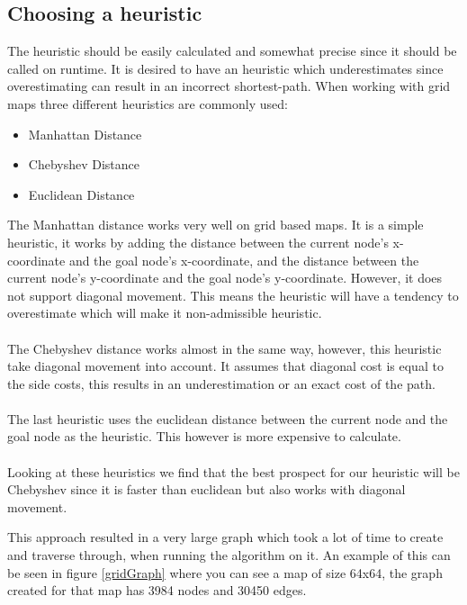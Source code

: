 \subsection*{Choosing a heuristic}
The heuristic should be easily calculated and somewhat precise since it should be called on runtime.
It is desired to have an heuristic which underestimates since overestimating can result in an incorrect shortest-path.
When working with grid maps three different heuristics are commonly used: %
\begin{itemize}
\item Manhattan Distance
\item Chebyshev Distance
\item Euclidean Distance
\end{itemize}
The Manhattan distance works very well on grid based maps. 
It is a simple heuristic, it works by adding the distance between the current node's x-coordinate and the goal node's x-coordinate, and the distance between the current node's y-coordinate and the goal node's y-coordinate.
However, it does not support diagonal movement. 
This means the heuristic will have a tendency to overestimate which will make it non-admissible heuristic.\\\\
The Chebyshev distance works almost in the same way, however, this heuristic take diagonal movement into account. 
It assumes that diagonal cost is equal to the side costs, this results in an underestimation or an exact cost of the path.\\\\
The last heuristic uses the euclidean distance between the current node and the goal node as the heuristic.
This however is more expensive to calculate.\\\\
Looking at these heuristics we find that the best prospect for our heuristic will be Chebyshev since it is faster than euclidean but also works with diagonal movement.

This approach resulted in a very large graph which took a lot of time to create and traverse through, when running the algorithm on it.
An example of this can be seen in figure \ref{gridGraph} where you can see a map of size 64x64, the graph created for that map has 3984 nodes and 30450 edges.